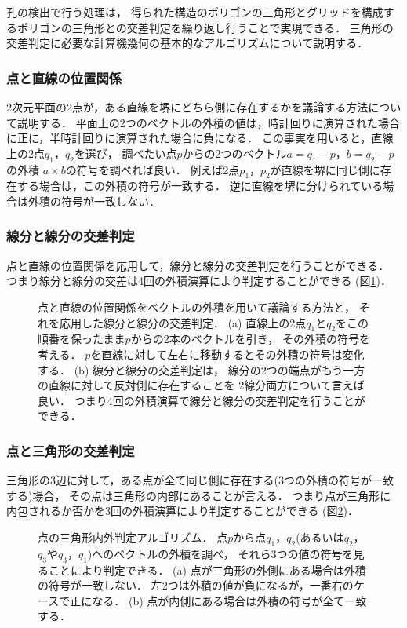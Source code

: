 孔の検出で行う処理は，
得られた構造のポリゴンの三角形とグリッドを構成するポリゴンの三角形との交差判定を繰り返し行うことで実現できる．
三角形の交差判定に必要な計算機幾何の基本的なアルゴリズムについて説明する．


\subsubsection{点と直線の位置関係}
2次元平面の2点が，ある直線を堺にどちら側に存在するかを議論する方法について説明する．
平面上の2つのベクトルの外積の値は，時計回りに演算された場合に正に，半時計回りに演算された場合に負になる．
この事実を用いると，直線上の2点$q_1$，$q_2$を選び，
調べたい点$p$からの2つのベクトル$a=q_1-p$，$b=q_2-p$の外積
$a\times b$の符号を調べれば良い．
例えば2点$p_1$，$p_2$が直線を堺に同じ側に存在する場合は，この外積の符号が一致する．
逆に直線を堺に分けられている場合は外積の符号が一致しない．


\subsubsection{線分と線分の交差判定}
点と直線の位置関係を応用して，線分と線分の交差判定を行うことができる．
つまり線分と線分の交差は4回の外積演算により判定することができる
(図\ref{fig:segment_segment})．
\begin{figure}
    \centering
    
    \caption{
        点と直線の位置関係をベクトルの外積を用いて議論する方法と，
        それを応用した線分と線分の交差判定．
        (a) 直線上の2点$q_1$と$q_2$をこの順番を保ったまま$p$からの2本のベクトルを引き，
            その外積の符号を考える．
            $p$を直線に対して左右に移動するとその外積の符号は変化する．
        (b) 線分と線分の交差判定は，
            線分の2つの端点がもう一方の直線に対して反対側に存在することを
            2線分両方について言えば良い．
            つまり4回の外積演算で線分と線分の交差判定を行うことができる．
    }
    \label{fig:segment_segment}
\end{figure}


\subsubsection{点と三角形の交差判定}
三角形の3辺に対して，ある点が全て同じ側に存在する(3つの外積の符号が一致する)場合，
その点は三角形の内部にあることが言える．
つまり点が三角形に内包されるか否かを3回の外積演算により判定することができる
(図\ref{fig:point_triangle})．
\begin{figure}
    \centering
    
    \caption{
        点の三角形内外判定アルゴリズム．
        点$p$から点$q_1$，$q_2$(あるいは$q_2$，$q_3$や$q_3$，$q_1$)へのベクトルの外積を調べ，
        それら3つの値の符号を見ることにより判定できる．
        (a) 点が三角形の外側にある場合は外積の符号が一致しない．
            左2つは外積の値が負になるが，一番右のケースで正になる．
        (b) 点が内側にある場合は外積の符号が全て一致する．
    }
    \label{fig:point_triangle}
\end{figure}



